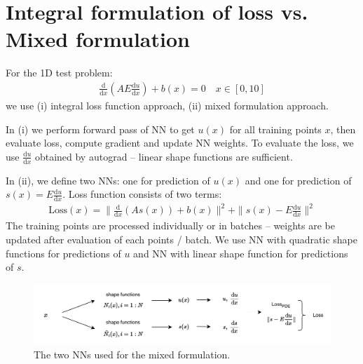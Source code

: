\section{Integral formulation of loss vs. Mixed formulation}

For the 1D test problem:
\begin{align*}
    \frac{\mathrm{d}}{\mathrm{d}x}\left( AE \frac{\mathrm{d}u}{\mathrm{d}x}\right) + b(x) = 0 \quad x\in [0,10]
\end{align*}
we use (i) integral loss function approach, (ii) mixed formulation approach. 

In (i) we perform forward pass of NN to get $u(x)$ for all training points $x$, then evaluate loss, compute gradient and update NN weights. To evaluate the loss, we use $\frac{\mathrm{d}u}{\mathrm{d}x}$ obtained by autograd -- linear shape functions are sufficient.

In (ii), we define two NNs: one for prediction of $u(x)$ and one for prediction of $s(x) = E\frac{\mathrm{d}u}{\mathrm{d}x}$. Loss function consists of two terms:
\begin{align*}
    \mathrm{Loss}(x) = \| \frac{\mathrm{d}}{\mathrm{d}x}\left( As(x)\right) + b(x)\|^2 + \| s(x) - E\frac{\mathrm{d}u}{\mathrm{d}x}\|^2
\end{align*}
The training points are processed individually or in batches  -- weights are be updated after evaluation of each points / batch. We use NN with quadratic shape functions for predictions of $u$ and NN with linear shape function for predictions of $s$.
\begin{figure}[h!]
    \centering
    \includegraphics[width = 0.8\linewidth]{Figures/Diagram_2.pdf}
    \caption{The two NNs used for the mixed formulation.}
\end{figure}


